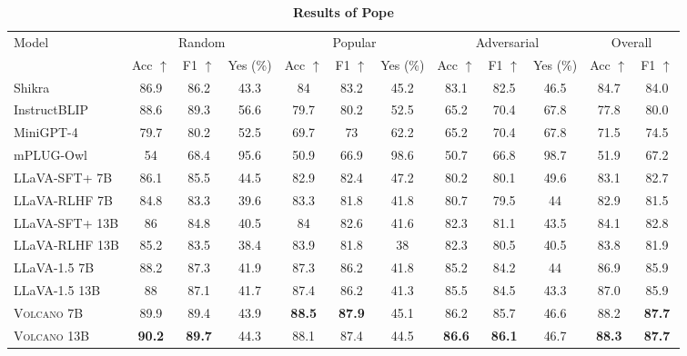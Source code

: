 \documentclass[11pt]{article}
\newcommand{\Ours}{\textsc{Volcano}}
\begin{document}
\begin{table*}[t]
\scriptsize
\centering
\begin{tabular}{lccc|ccc|ccc|cc}
\toprule
\multirow{2}{*}{Model}  & \multicolumn{3}{c|}{Random} &	\multicolumn{3}{c|}{Popular} & \multicolumn{3}{c|}{Adversarial} & \multicolumn{2}{c}{Overall}\\
& Acc $\uparrow$ & F1 $\uparrow$ & Yes (\%) & Acc $\uparrow$ & F1 $\uparrow$ & Yes (\%) & Acc $\uparrow$ & F1 $\uparrow$ & Yes (\%) & Acc $\uparrow$ & F1 $\uparrow$ \\
\midrule
Shikra & 86.9 & 86.2 & 43.3 & 84 & 83.2 & 45.2 & 83.1 & 82.5 & 46.5 & 84.7 & 84.0 \\
InstructBLIP & 88.6 & 89.3 & 56.6	& 79.7	& 80.2	& 52.5&	65.2	&70.4	&67.8	&77.8	&80.0\\
MiniGPT-4&	79.7	&80.2&	52.5	&69.7&	73	&62.2&	65.2&	70.4&	67.8&	71.5	&74.5\\
mPLUG-Owl&	54	&68.4	&95.6&	50.9	&66.9&	98.6&	50.7&	66.8	&98.7&	51.9	&67.2\\
LLaVA-SFT+ 7B&	86.1	&85.5	&44.5	&82.9&	82.4	&47.2	&80.2&	80.1&	49.6	&83.1&	82.7\\
LLaVA-RLHF 7B&	84.8&	83.3&	39.6&	83.3	&81.8&	41.8	&80.7	&79.5	&44	&82.9&	81.5 \\
LLaVA-SFT+ 13B&	86&	84.8&	40.5&	84&	82.6&	41.6&	82.3	&81.1&	43.5&	84.1&	82.8\\
LLaVA-RLHF 13B&	85.2	&83.5	&38.4&	83.9&	81.8	&38	&82.3&	80.5	&40.5&	83.8&	81.9 \\
\midrule
LLaVA-1.5 7B	&88.2	&87.3&	41.9&	87.3	&86.2	&41.8&	85.2	&84.2	&44&	86.9	&85.9 \\
LLaVA-1.5 13B&	88&	87.1	&41.7&	87.4	&86.2	&41.3	&85.5&	84.5	&43.3	&87.0	&85.9 \\
{\Ours} 7B&	89.9	&89.4	&43.9	&\textbf{88.5}&	\textbf{87.9}	&45.1	&86.2&	85.7&	46.6	&88.2&	\textbf{87.7} \\
{\Ours} 13B& \textbf{90.2}& \textbf{89.7}& 44.3& 88.1& 87.4& 44.5& \textbf{86.6}& \textbf{86.1}& 46.7& \textbf{88.3}& \textbf{87.7}\\										
\bottomrule
\end{tabular}
\caption{\textbf{Results of Pope}}
\label{tab:Table7}
\end{table*}
\end{document}
